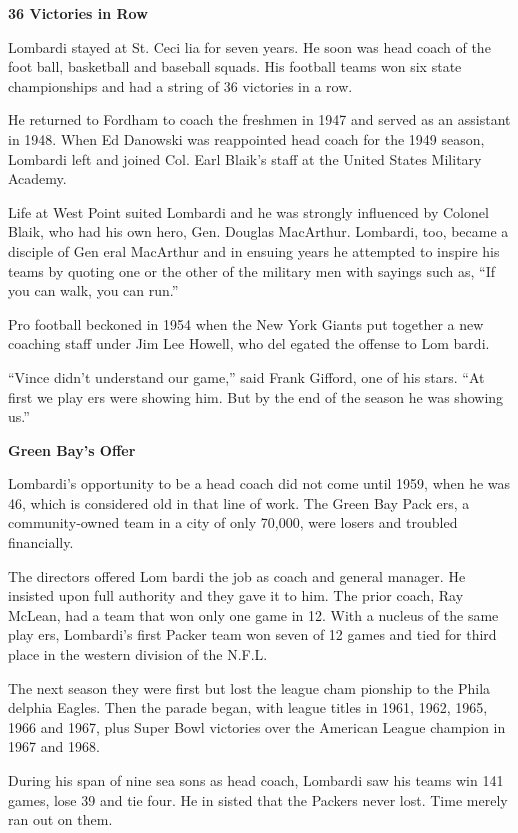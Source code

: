 \textbf{36 Victories in Row}

Lombardi stayed at St. Ceci lia for seven years. He soon was head coach
of the foot ball, basketball and baseball squads. His football teams won
six state championships and had a string of 36 victories in a row.

He returned to Fordham to coach the freshmen in 1947 and served as an
assistant in 1948. When Ed Danowski was reappointed head coach for the
1949 season, Lombardi left and joined Col. Earl Blaik's staff at the
United States Military Academy.

Life at West Point suited Lombardi and he was strongly influenced by
Colonel Blaik, who had his own hero, Gen. Douglas MacArthur. Lombardi,
too, became a disciple of Gen eral MacArthur and in ensuing years he
attempted to inspire his teams by quoting one or the other of the
military men with sayings such as, ``If you can walk, you can run.''

Pro football beckoned in 1954 when the New York Giants put together a
new coaching staff under Jim Lee Howell, who del egated the offense to
Lom bardi.

``Vince didn't understand our game,'' said Frank Gifford, one of his
stars. ``At first we play ers were showing him. But by the end of the
season he was showing us.''

\textbf{Green Bay's Offer}

Lombardi's opportunity to be a head coach did not come until 1959, when
he was 46, which is considered old in that line of work. The Green Bay
Pack ers, a community‐owned team in a city of only 70,000, were losers
and troubled financially.

The directors offered Lom bardi the job as coach and general manager. He
insisted upon full authority and they gave it to him. The prior coach,
Ray McLean, had a team that won only one game in 12. With a nucleus of
the same play ers, Lombardi's first Packer team won seven of 12 games
and tied for third place in the western division of the N.F.L.

The next season they were first but lost the league cham pionship to the
Phila delphia Eagles. Then the parade began, with league titles in 1961,
1962, 1965, 1966 and 1967, plus Super Bowl victories over the American
League champion in 1967 and 1968.

During his span of nine sea sons as head coach, Lombardi saw his teams
win 141 games, lose 39 and tie four. He in sisted that the Packers never
lost. Time merely ran out on them.

